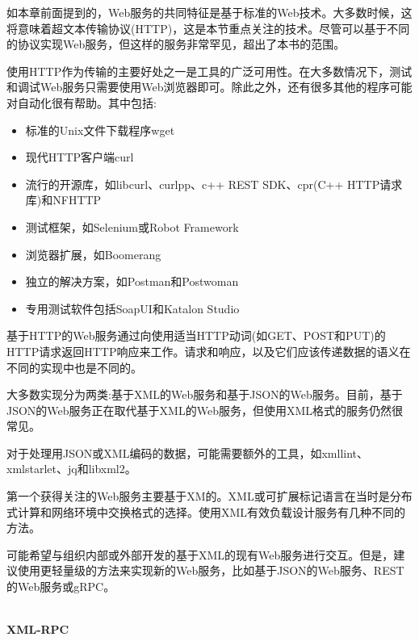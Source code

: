 
如本章前面提到的，Web服务的共同特征是基于标准的Web技术。大多数时候，这将意味着超文本传输协议(HTTP)，这是本节重点关注的技术。尽管可以基于不同的协议实现Web服务，但这样的服务非常罕见，超出了本书的范围。


使用HTTP作为传输的主要好处之一是工具的广泛可用性。在大多数情况下，测试和调试Web服务只需要使用Web浏览器即可。除此之外，还有很多其他的程序可能对自动化很有帮助。其中包括:

\begin{itemize}
\item 
标准的Unix文件下载程序wget

\item 
现代HTTP客户端curl

\item 
流行的开源库，如libcurl、curlpp、c++ REST SDK、cpr(C++ HTTP请求库)和NFHTTP

\item 
测试框架，如Selenium或Robot Framework

\item 
浏览器扩展，如Boomerang

\item 
独立的解决方案，如Postman和Postwoman

\item 
专用测试软件包括SoapUI和Katalon Studio
\end{itemize}

基于HTTP的Web服务通过向使用适当HTTP动词(如GET、POST和PUT)的HTTP请求返回HTTP响应来工作。请求和响应，以及它们应该传递数据的语义在不同的实现中也是不同的。

大多数实现分为两类:基于XML的Web服务和基于JSON的Web服务。目前，基于JSON的Web服务正在取代基于XML的Web服务，但使用XML格式的服务仍然很常见。

对于处理用JSON或XML编码的数据，可能需要额外的工具，如xmllint、xmlstarlet、jq和libxml2。


第一个获得关注的Web服务主要基于XM的。XML或可扩展标记语言在当时是分布式计算和网络环境中交换格式的选择。使用XML有效负载设计服务有几种不同的方法。

可能希望与组织内部或外部开发的基于XML的现有Web服务进行交互。但是，建议使用更轻量级的方法来实现新的Web服务，比如基于JSON的Web服务、REST的Web服务或gRPC。

\hspace*{\fill} \\ %
\noindent
\textbf{XML-RPC}

